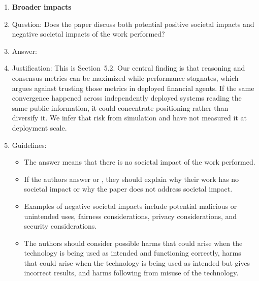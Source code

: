 \begin{enumerate}
\item {\bf Broader impacts}
    \item[] Question: Does the paper discuss both potential positive societal impacts and negative societal impacts of the work performed?
    \item[] Answer: \answerYes{}
    \item[] Justification: This is Section~5.2. Our central finding is that reasoning and consensus metrics can be maximized while performance stagnates, which argues against trusting those metrics in deployed financial agents. If the same convergence happened across independently deployed systems reading the same public information, it could concentrate positioning rather than diversify it. We infer that risk from simulation and have not measured it at deployment scale.
    \item[] Guidelines:
    \begin{itemize}
        \item The answer \answerNA{} means that there is no societal impact of the work performed.
        \item If the authors answer \answerNA{} or \answerNo, they should explain why their work has no societal impact or why the paper does not address societal impact.
        \item Examples of negative societal impacts include potential malicious or unintended uses, fairness considerations, privacy considerations, and security considerations.
        \item The authors should consider possible harms that could arise when the technology is being used as intended and functioning correctly, harms that could arise when the technology is being used as intended but gives incorrect results, and harms following from misuse of the technology.
    \end{itemize}


\end{enumerate}
